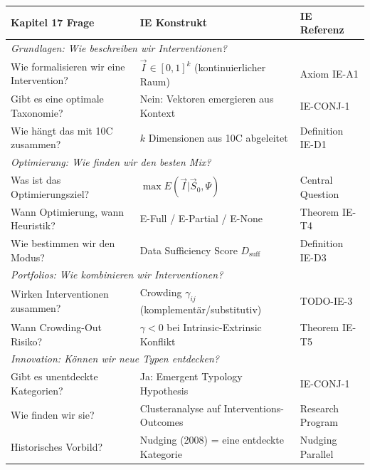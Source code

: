 \begin{tcolorbox}[colback=purple!5!white, colframe=purple!75!black,
    title=Chapter Linkage]
\vspace{0.5em}
\begin{center}
\small
\begin{tabular}{p{4.5cm}p{4cm}p{3cm}}
\toprule
\textbf{Kapitel 17 Frage} & \textbf{IE Konstrukt} & \textbf{IE Referenz} \\
\midrule
\multicolumn{3}{l}{\textit{Grundlagen: Wie beschreiben wir Interventionen?}} \\
\midrule
Wie formalisieren wir eine Intervention? & $\vec{I} \in [0,1]^k$ (kontinuierlicher Raum) & Axiom IE-A1 \\
Gibt es eine optimale Taxonomie? & Nein: Vektoren emergieren aus Kontext & IE-CONJ-1 \\
Wie hängt das mit 10C zusammen? & $k$ Dimensionen aus 10C abgeleitet & Definition IE-D1 \\
\midrule
\multicolumn{3}{l}{\textit{Optimierung: Wie finden wir den besten Mix?}} \\
\midrule
Was ist das Optimierungsziel? & $\max E(\vec{I} | \vec{S}_0, \Psi)$ & Central Question \\
Wann Optimierung, wann Heuristik? & E-Full / E-Partial / E-None & Theorem IE-T4 \\
Wie bestimmen wir den Modus? & Data Sufficiency Score $D_{\text{suff}}$ & Definition IE-D3 \\
\midrule
\multicolumn{3}{l}{\textit{Portfolios: Wie kombinieren wir Interventionen?}} \\
\midrule
Wirken Interventionen zusammen? & Crowding $\gamma_{ij}$ (komplementär/substitutiv) & TODO-IE-3 \\
Wann Crowding-Out Risiko? & $\gamma < 0$ bei Intrinsic-Extrinsic Konflikt & Theorem IE-T5 \\
\midrule
\multicolumn{3}{l}{\textit{Innovation: Können wir neue Typen entdecken?}} \\
\midrule
Gibt es unentdeckte Kategorien? & Ja: Emergent Typology Hypothesis & IE-CONJ-1 \\
Wie finden wir sie? & Clusteranalyse auf Interventions-Outcomes & Research Program \\
Historisches Vorbild? & Nudging (2008) = eine entdeckte Kategorie & Nudging Parallel \\
\bottomrule
\end{tabular}
\end{center}


\end{tcolorbox}

